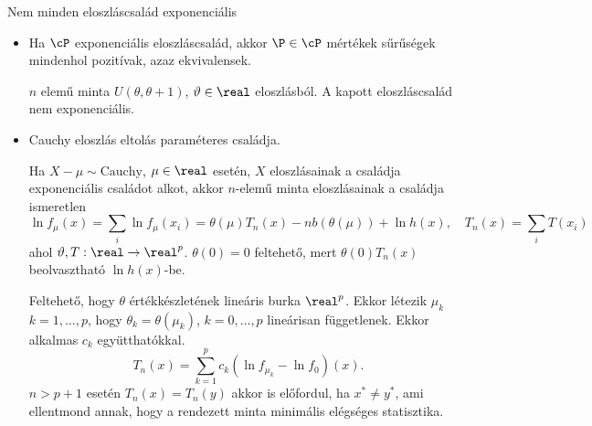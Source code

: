 \documentclass[aspectratio=169,notheorems,9pt,\option]{beamer}
\begin{document}
\begin{frame}{Nem minden eloszláscsalád exponenciális}
  \begin{itemize}
    \item Ha $\cP$ exponenciális eloszláscsalád, akkor $\P\in\cP$ mértékek sűrűségek mindenhol pozitívak, 
    azaz ekvivalensek.

    $n$ elemű minta $U(\theta,\theta+1)$, $\theta\in\real$ eloszlásból.
    A kapott eloszláscsalád nem exponenciális.
    \item Cauchy eloszlás eltolás paraméteres családja. 
    
    Ha $X-\mu\sim \text{Cauchy}$, $\mu\in\real$ esetén, $X$ eloszlásainak a családja exponenciális családot alkot, 
    akkor $n$-elemű minta eloszlásainak a családja ismeretlen
    \begin{displaymath}
      \ln f_\mu(x)=\sum_i \ln f_\mu(x_i)=\theta(\mu)T_n(x)-nb(\theta(\mu))+\ln h(x), \quad T_n(x)=\sum_i T(x_i) 
    \end{displaymath}
    ahol $\theta,T:\real\to\real^p$. $\theta(0)=0$ feltehető, mert $\theta(0)T_n(x)$ beolvasztható $\ln h(x)$-be. 

    Feltehető, hogy $\theta$ értékkészletének lineáris burka $\real^p$. Ekkor létezik $\mu_k$ $k=1,\dots,p$, 
    hogy $\theta_k=\theta(\mu_k)$, $k=0,\dots,p$ lineárisan függetlenek. Ekkor alkalmas $c_k$ együtthatókkal.
    \begin{displaymath}
      T_n(x)=\sum_{k=1}^p c_k (\ln f_{\mu_k}-\ln f_0)(x).
    \end{displaymath}
    $n>p+1$ esetén $T_n(x)=T_n(y)$ akkor is előfordul, ha $x^*\neq y^*$, ami ellentmond annak, hogy a 
    rendezett minta minimális elégséges statisztika.

  \end{itemize}
  
\end{frame}
\end{document}
